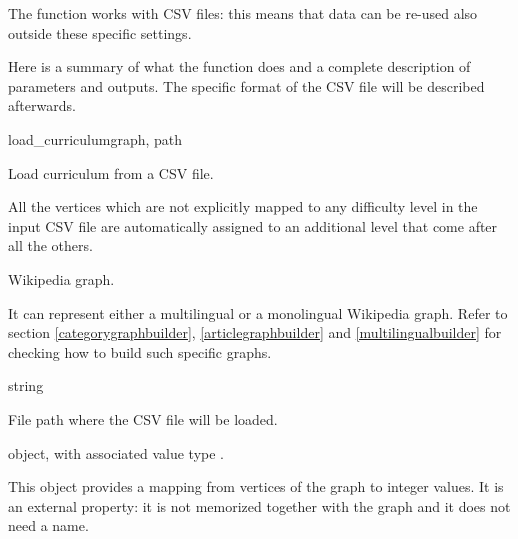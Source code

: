             The function works with CSV files: this means that data can be re-used also outside these specific settings.
            
            Here is a summary of what the function does and a complete description of parameters and outputs. The specific format of the CSV file will be described afterwards.
            \begin{independentfunctiondoc}{load\_curriculum}{graph, path}
                \begin{functiondescription}
                    Load curriculum from a CSV file.
                    
                    All the vertices which are not explicitly mapped to any difficulty level in the input CSV file are automatically assigned to an additional level that come after all the others.
                \end{functiondescription}
                
                \begin{functionparameters}
                    \item[graph] 
                    
                    Wikipedia graph.
                    
                    It can represent either a multilingual or a monolingual Wikipedia graph. Refer to section \ref{categorygraphbuilder}, \ref{articlegraphbuilder} and \ref{multilingualbuilder} for checking how to build such specific graphs.
                    \item[path] string
                    
                    File path where the CSV file will be loaded.
                \end{functionparameters}
                
                \begin{functionoutput}
                     object, with associated value type .
                    
                    This object provides a mapping from vertices of the graph to integer values. It is an external property: it is not memorized together with the graph and it does not need a name.
                \end{functionoutput}
            \end{independentfunctiondoc}
